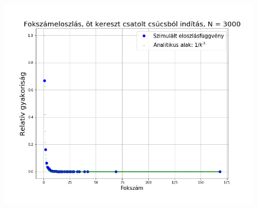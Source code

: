 \documentclass[a4paper, 12pt]{article}
\numberwithin{equation}{section}          %
\numberwithin{figure}{subsection}
\begin{document}
\begin{figure}[c!]
	\begin{center}
		\includegraphics[width=1\textwidth]{harmadik.png}
	\end{center}
\end{figure}
\clearpage
\end{document}
